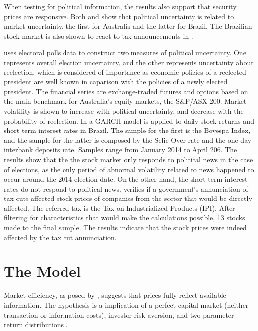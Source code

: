 \documentclass[cic,tc, english]{iiufrgs}
\begin{document}
    When testing for political information, the results also support that security prices are responsive. Both \citet{smales2015} and \citet{marquessantos2016} show that political uncertainty is related to market uncertainty, the first for Australia and the latter for Brazil. The Brazilian stock market is also shown to react to tax announcements in \cite{gabrielribeiro2013}.

    \citet{smales2015} uses electoral polls data to construct two measures of political uncertainty. One represents overall election uncertainty, and the other represents uncertainty about reelection, which is considered of importance as economic policies of a reelected president are well known in caparison with the policies of a newly elected president. The financial series are exchange-traded futures and options based on the main benchmark for Australia's equity markets, the S\&P/ASX 200. Market volatility is shown to increase with political uncertainty, and decrease with the probability of reelection.
    In \citet{marquessantos2016} a GARCH model is applied to daily stock returns and short term interest rates in Brazil. The sample for the first is the Bovespa Index, and the sample for the latter is composed by the Selic Over rate and the one-day interbank deposits rate. Samples range from January 2014 to April 206. The results show that the the stock market only responds to political news in the case of elections, as the only period of abnormal volatility related to news happened to occur around the 2014 election date. On the other hand, the short term interest rates do not respond to political news.
    \cite{gabrielribeiro2013} verifies if a government's annunciation of tax cuts affected stock prices of companies from the sector that would be directly affected. The referred tax is the Tax on Industrialized Products (IPI). After filtering for characteristics that would make the calculations possible, 13 stocks made to the final sample. The results indicate that the stock prices were indeed affected by the tax cut annunciation.

\chapter{The Model} \label{chapter_model}

    Market efficiency, as posed by \citet{fama1970}, suggests that prices fully reflect available information. The hypothesis is a implication of a perfect capital market (neither transaction or information costs), investor risk aversion, and two-parameter return distributions \citet{famamcbeth1973}.
\end{document}
